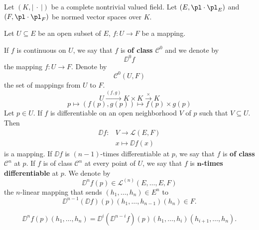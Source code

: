 Let $(K,\left|\ \cdot\ \right|)$ be a complete nontrivial valued field. Let $(E,\pl\cdot\pl_E)$ and $(F,\pl\cdot\pl_F)$ be normed vector spaces over $K$.
\begin{definitionenv}
    Let $U\subseteq E$ be an open subset of $E$, $f:U\longrightarrow F$ be a mapping. 

    If $f$ is continuous on $U$, we say that $f$ is \textbf{of class $\mathcal{C}^0$} and we denote by 
    $$\DD^0f$$
    the mapping $f:U\longrightarrow F$. Denote by 
    $$\mathcal{C}^0(U,F)$$
    the set of mappings from $U$ to $F$.
    $$U\overset{(f,g)}{\longrightarrow}K\times K\overset{\times}{\longrightarrow}K$$
    $$p\longmapsto (f(p),g(p))\longmapsto f(p)\times g(p)$$
    Let $p\in U$. If $f$ is differentiable on an open neighborhood $V$ of $p$ such that $V\subseteq U$. Then
    \begin{align*}
        \DD f:&V\longrightarrow \mathscr{L}(E,F)\\
        &x\longmapsto \DD f(x)
    \end{align*} 
    is a mapping. If $\DD f$ is $(n-1)$-times differentiable at $p$, we say that $f$ is \textbf{of class $\mathcal{C}^n$} at $p$. If $f$ is of class $\mathcal{C}^n$ at every point of $U$, we say that $f$ is \textbf{$\mathbf{n}$-times differentiable} at $p$. We denote by
    $$\DD^n f(p)\in\mathscr{L}^{(n)}(E,\ldots,E,F)$$
    the $n$-linear mapping that sends $(h_1,\ldots,h_n)\in E^n$ to
    $$\DD^{n-1} (\DD f)(p)(h_1,\ldots,h_{n-1})(h_n)\in F.$$
\end{definitionenv}
\begin{remark}
    $$\DD^n f(p)(h_1,\ldots,h_n)=\DD^{i} (\DD^{n-i} f)(p)(h_1,\ldots,h_{i})(h_{i+1},\ldots,h_n).$$
\end{remark}
\newpage
